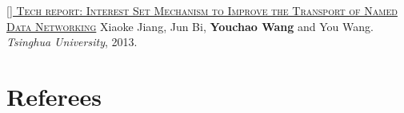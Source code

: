 \documentclass[11pt,a4paper]{moderncv}
\begin{document}
\addtocounter{counter}{1}

\href{http://netarchlab.tsinghua.edu.cn/~shock/THU-NetArchLab-ICN-TR-ISTSET-20130517.pdf}{\textsc{[] Tech report: Interest Set Mechanism to Improve the Transport of Named Data Networking}}
\newline  Xiaoke Jiang, Jun Bi, \textbf{Youchao Wang} and You Wang.\textit{ Tsinghua University}, 2013. 

\addtocounter{counter}{1}

\vspace*{-0.4cm}

\section{Referees}
\vspace*{-0.2cm}
\end{document}
